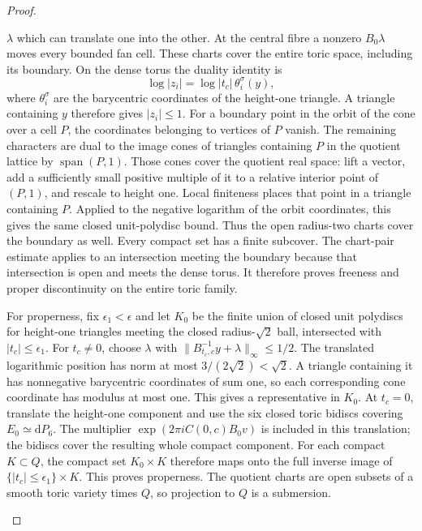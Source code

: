 \begin{proof}
\begin{enumerate}[label=\arabic*.,leftmargin=*]
$\lambda$ which can translate one into the other. At the central
fibre a nonzero $B_0\lambda$ moves every bounded fan cell.
These charts cover the entire toric space, including its boundary.
On the dense torus the duality identity is
\[
 \log|z_i|=\log|t_c|\,\theta_i^\sigma(y),
\]
where $\theta_i^\sigma$ are the barycentric coordinates of the
height-one triangle. A triangle containing $y$ therefore gives
$|z_i|\le1$. For a boundary point in the orbit of the cone over a
cell $P$, the coordinates belonging to vertices of $P$ vanish.
The remaining characters are dual to the image cones of triangles
containing $P$ in the quotient lattice by $\operatorname{span}(P,1)$.
Those cones cover the quotient real space: lift a vector, add a
sufficiently small positive multiple of it to a relative interior
point of $(P,1)$, and rescale to height one. Local finiteness places
that point in a triangle containing $P$. Applied to the negative
logarithm of the orbit coordinates, this gives the same closed
unit-polydisc bound. Thus the open radius-two charts cover the
boundary as well. Every compact set has a finite subcover.
The chart-pair estimate applies to an intersection meeting the
boundary because that intersection is open and meets the dense
torus. It therefore proves freeness and proper discontinuity on
the entire toric family.

For properness, fix $\epsilon_1<\epsilon$ and let $K_0$ be the
finite union of closed unit polydiscs for height-one triangles
meeting the closed radius-$\sqrt2$ ball, intersected with
$|t_c|\le\epsilon_1$. For $t_c\ne0$, choose $\lambda$ with
$\|B_{t_c,c}^{-1}y+\lambda\|_\infty\le1/2$.
The translated logarithmic position has norm at most
$3/(2\sqrt2)<\sqrt2$. A triangle containing it has nonnegative
barycentric coordinates of sum one, so each corresponding cone
coordinate has modulus at most one. This gives a representative
in $K_0$. At $t_c=0$, translate the height-one component and use
the six closed toric bidiscs covering $E_0\simeq\mathrm dP_6$.
The multiplier $\exp(2\pi iC(0,c)B_0v)$ is included in this
translation; the bidiscs cover the resulting whole compact component.
For each compact $K\subset Q$, the compact set $K_0\times K$
therefore maps onto the full inverse image of
$\{|t_c|\le\epsilon_1\}\times K$. This proves properness.
The quotient charts are open subsets of a smooth toric variety
times $Q$, so projection to $Q$ is a submersion.


\end{enumerate}
\end{proof}
